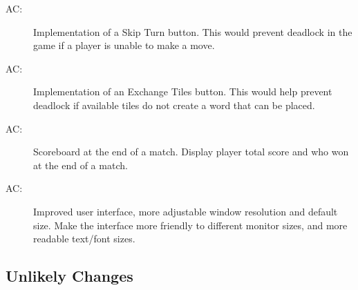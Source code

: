 \documentclass[12pt, titlepage]{article}
\newcounter{acnum}
\newcommand{\actheacnum}{AC\theacnum}
\begin{document}

\begin{description}
\item [ \actheacnum \label{acSkipTurn}:] Implementation of a Skip Turn button. This would prevent deadlock in the game if a player is unable to make a move. 
\item [ \actheacnum \label{acExchangeTile}:] Implementation of an Exchange Tiles button. This would help prevent deadlock if available tiles do not create a word that can be placed.
\item [ \actheacnum \label{acScoreboard}:] Scoreboard at the end of a match. Display player total score and who won at the end of a match. 
\item [ \actheacnum \label{acGUI}:] Improved user interface, more adjustable window resolution and default size. Make the interface more friendly to different monitor sizes, and more readable text/font sizes.
\end{description}

\subsection{Unlikely Changes} \label{SecUchange}

\end{document}
